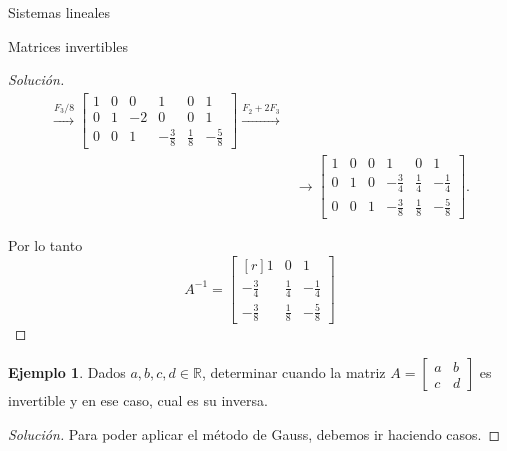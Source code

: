\documentclass[a4paper,12pt,twoside,spanish,reqno]{amsbook}
\theoremstyle{definition}
\newtheorem{ejemplo}{Ejemplo}[section]
\theoremstyle{remark}
\begin{document}
\begin{chapter}{Sistemas lineales}
\begin{section}{Matrices invertibles}
\begin{proof}[Solución]
\begin{align*}
				\stackrel{F_3/8}{\longrightarrow}
				\left[\begin{array}{rrr|rrr}	1&0&0&1&0&1\\ 0&1&-2&0&0&1 \\ 0&0&1&-\frac38&\frac18&-\frac58 \end{array}\right]
				\stackrel{F_2+2F_3}{\longrightarrow} \\
				&\longrightarrow
				\left[\begin{array}{rrr|rrr}	1&0&0&1&0&1\\ 0&1&0&-\frac34&\frac14&-\frac14 \\ 0&0&1&-\frac38&\frac18&-\frac58 \end{array}\right].
				\end{align*}
				
				Por lo tanto 
				\begin{equation*}
				A^{-1} = 	\begin{bmatrix*}[r]	1&0&1\\ -\frac34&\frac14&-\frac14 \\ -\frac38&\frac18&-\frac58 \end{bmatrix*}
				\end{equation*}
			\end{proof}
			
			\begin{ejemplo}\label{inv-2x2-0}
				Dados $a,b,c,d \in \mathbb R$, determinar cuando la matriz $A = \begin{bmatrix*} a&b\\c&d\end{bmatrix*}$  es invertible y en ese caso,  cual es su inversa. 
			\end{ejemplo}
			\begin{proof}[Solución] Para poder aplicar el método de Gauss, debemos ir haciendo casos. 
				

\end{proof}
\end{section}
\end{chapter}
\end{document}
